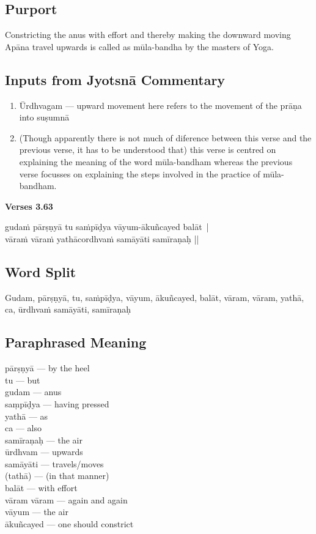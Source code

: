 \subsection*{Purport}

Constricting the anus with effort and thereby making the downward moving Apāna travel upwards is called as mūla-bandha by the masters of Yoga.

\subsection*{Inputs from Jyotsnā Commentary}

\begin{enumerate}
\item Ūrdhvagam --- upward movement here refers to the movement of the  prāṇa into suṣumnā
\item (Though apparently there is not much of diference between this verse and the previous verse, it has to be understood that) this verse is centred on explaining the meaning of the word mūla-bandham whereas the previous verse focusses on explaining the steps involved in the practice of mūla-bandham.
\end{enumerate}


\noindent \textbf{Verses 3.63}

\begin{shloka}
gudaṁ pārṣṇyā tu saṁpīḍya vāyum-ākuñcayed balāt |\\
vāraṁ vāraṁ yathācordhvaṁ samāyāti samīraṇaḥ ||
\end{shloka}

\subsection*{Word Split}

Gudam, pārṣṇyā, tu, saṁpīḍya, vāyum, ākuñcayed, balāt, vāram, vāram, yathā, ca, ūrdhvaṁ samāyāti, samīraṇaḥ

\subsection*{Paraphrased Meaning}

\begin{multicols}{2}
pārṣṇyā --- by the heel \\
tu ---  but  \\
gudam --- anus \\
saṃpīḍya --- having pressed \\
yathā --- as\\
ca --- also \\
samīraṇaḥ --- the air \\
ūrdhvam --- upwards \\
samāyāti --- travels/moves  \\
(tathā) --- (in that manner)\\
balāt --- with effort \\
vāram vāram --- again and again \\
vāyum --- the air\\
ākuñcayed --- one should constrict
\end{multicols}

